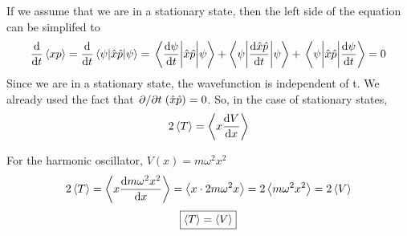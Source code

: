 \documentclass[12pt]{article}
\begin{document}
If we assume that we are in a stationary state, then the left side of the equation can be simplifed to 
\[\dv{t}\ev{xp} = \dv{t}\ev{\hat{x}\hat{p}}{\psi} = \mel{\dv{\psi}{t}}{\hat{x}\hat{p}}{\psi} + \mel**{\psi}{\dv{\hat{x}\hat{p}}{t}}{\psi} + \mel{\psi}{\hat{x}\hat{p}}{\dv{\psi}{t}} = 0\]
Since we are in a stationary state, the wavefunction is independent of t. We already used the fact that $\pdv*{t}(\hat{x}\hat{p}) = 0$.
So, in the case of stationary states,
\[2\ev{T} = \ev{x \dv{V}{x}}\]

For the harmonic oscillator, $V(x) = m \omega^2 x^2$
\[2\ev{T} = \ev{x \dv{m \omega^2 x^2}{x}} = \ev{x \cdot 2 m \omega^2 x} =2\ev{m \omega^2 x^2} = 2\ev{V} \]
\[\boxed{\ev{T} = \ev{V}}\]




\newpage
\end{document}
